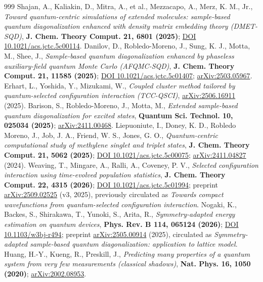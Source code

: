 \documentclass[onecolumn,a4paper]{quantumarticle}
\begin{document}
\begin{thebibliography}{999}
 Shajan, A., Kaliakin, D., Mitra, A., et al., Mezzacapo, A., Merz, K. M., Jr., \emph{Toward quantum-centric simulations of extended molecules: sample-based quantum diagonalization enhanced with density matrix embedding theory (DMET-SQD)}, \textbf{J. Chem. Theory Comput. 21, 6801 (2025)}; \href{https://doi.org/10.1021/acs.jctc.5c00114}{DOI 10.1021/acs.jctc.5c00114}.
 Danilov, D., Robledo-Moreno, J., Sung, K. J., Motta, M., Shee, J., \emph{Sample-based quantum diagonalization enhanced by phaseless auxiliary-field quantum Monte Carlo (AFQMC-SQD)}, \textbf{J. Chem. Theory Comput. 21, 11585 (2025)}; \href{https://doi.org/10.1021/acs.jctc.5c01407}{DOI 10.1021/acs.jctc.5c01407}; \href{https://arxiv.org/abs/2503.05967}{arXiv:2503.05967}.
 Erhart, L., Yoshida, Y., Mizukami, W., \emph{Coupled cluster method tailored by quantum-selected configuration interaction (TCC-QSCI)}, \href{https://arxiv.org/abs/2506.16911}{arXiv:2506.16911} (2025).
 Barison, S., Robledo-Moreno, J., Motta, M., \emph{Extended sample-based quantum diagonalization for excited states}, \textbf{Quantum Sci. Technol. 10, 025034 (2025)}; \href{https://arxiv.org/abs/2411.00468}{arXiv:2411.00468}.
 Liepuoniute, I., Doney, K. D., Robledo Moreno, J., Job, J. A., Friend, W. S., Jones, G. O., \emph{Quantum-centric computational study of methylene singlet and triplet states}, \textbf{J. Chem. Theory Comput. 21, 5062 (2025)}; \href{https://doi.org/10.1021/acs.jctc.5c00075}{DOI 10.1021/acs.jctc.5c00075}; \href{https://arxiv.org/abs/2411.04827}{arXiv:2411.04827} (2024).
 Weaving, T., Mingare, A., Ralli, A., Coveney, P. V., \emph{Selected configuration interaction using time-evolved population statistics}, \textbf{J. Chem. Theory Comput. 22, 4315 (2026)}; \href{https://doi.org/10.1021/acs.jctc.5c01994}{DOI 10.1021/acs.jctc.5c01994}; preprint \href{https://arxiv.org/abs/2509.02525}{arXiv:2509.02525} (v3, 2025), previously circulated as \emph{Towards compact wavefunctions from quantum-selected configuration interaction}.
 Nogaki, K., Backes, S., Shirakawa, T., Yunoki, S., Arita, R., \emph{Symmetry-adapted energy estimation on quantum devices}, \textbf{Phys. Rev. B 114, 065124 (2026)}; \href{https://doi.org/10.1103/w3bj-r494}{DOI 10.1103/w3bj-r494}; preprint \href{https://arxiv.org/abs/2505.00914}{arXiv:2505.00914} (2025), circulated as \emph{Symmetry-adapted sample-based quantum diagonalization: application to lattice model}.
 Huang, H.-Y., Kueng, R., Preskill, J., \emph{Predicting many properties of a quantum system from very few measurements (classical shadows)}, \textbf{Nat. Phys. 16, 1050 (2020)}; \href{https://arxiv.org/abs/2002.08953}{arXiv:2002.08953}.

\end{thebibliography}
\end{document}

